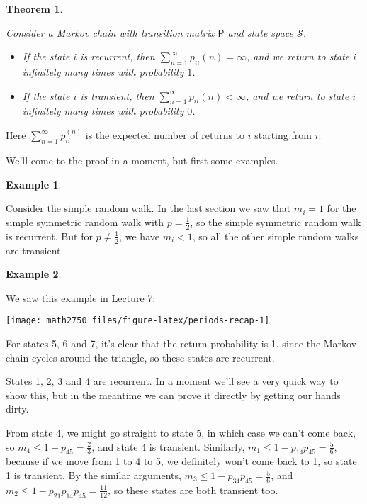 \documentclass[
  a4paper,
]{article}
\providecommand{\tightlist}{%
  \setlength{\itemsep}{0pt}\setlength{\parskip}{0pt}}
\newtheorem{theorem}{Theorem}[section]
\theoremstyle{definition}
\theoremstyle{definition}
\newtheorem{example}{Example}[section]
\theoremstyle{definition}
\theoremstyle{remark}
\begin{document}
\begin{theorem}
\protect\hypertarget{thm:rectran}{}\label{thm:rectran}

Consider a Markov chain with transition matrix \(\mathsf P\) and state space \(\mathcal S\).

\begin{itemize}
\tightlist
\item
  If the state \(i\) is recurrent, then \(\sum_{n=1}^\infty p_{ii}(n) = \infty\), and we return to state \(i\) infinitely many times with probability \(1\).
\item
  If the state \(i\) is transient, then \(\sum_{n=1}^\infty p_{ii}(n) < \infty\), and we return to state \(i\) infinitely many times with probability \(0\).
\end{itemize}

\end{theorem}

Here \(\sum_{n=1}^\infty p_{ii}^{(n)}\) is the expected number of returns to \(i\) starting from \(i\).

We'll come to the proof in a moment, but first some examples.

\begin{example}
\protect\hypertarget{exm:rw-rec-trans}{}\label{exm:rw-rec-trans}

Consider the simple random walk. \protect\hyperlink{S08-return-rw}{In the last section} we saw that \(m_i = 1\) for the simple symmetric random walk with \(p = \frac12\), so the simple symmetric random walk is recurrent. But for \(p \neq \frac12\), we have \(m_i < 1\), so all the other simple random walks are transient.

\end{example}

\begin{example}
\protect\hypertarget{exm:rec}{}\label{exm:rec}

We saw \protect\hyperlink{periodicity}{this example in Lecture 7}:

\begin{center}\texttt{[image: math2750\_files/figure-latex/periods-recap-1]} \end{center}

For states 5, 6 and 7, it's clear that the return probability is 1, since the Markov chain cycles around the triangle, so these states are recurrent.

States 1, 2, 3 and 4 are recurrent. In a moment we'll see a very quick way to show this, but in the meantime we can prove it directly by getting our hands dirty.

From state 4, we might go straight to state 5, in which case we can't come back, so \(m_4 \leq 1 - p_{45} = \frac23\), and state 4 is transient. Similarly, \(m_1 \leq 1 - p_{14}p_{45} = \frac56\), because if we move from 1 to 4 to 5, we definitely won't come back to 1, so state 1 is transient. By the similar arguments, \(m_3 \leq 1 - p_{34}p_{45} = \frac56\), and \(m_2 \leq 1 - p_{21}p_{14}p_{45} = \frac{11}{12}\), so these states are both transient too.

\end{example}
\end{document}

